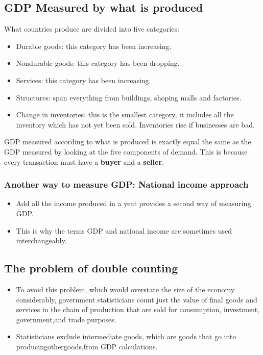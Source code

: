 \documentclass{article}
\begin{document}

\subsection{GDP Measured by what is produced}
What countries produce are divided into five categories: 
\begin{itemize}
    \item Durable goods: this category has been increasing.
    \item Nondurable goods: this category has been dropping.
    \item Services: this category has been increasing. 
    \item Structures: span everything from buildings, shoping malls and factories.
    \item Change in inventories: this is the smallest category, it includes all the inventory which has not yet been sold. Inventories rise if businesses are bad. 
\end{itemize}
GDP measured according to what is produced is exactly equal the same as the GDP measured by looking at the five components of demand. This is because every transaction must have a \textbf{buyer} and a \textbf{seller}.

\subsubsection{Another way to measure GDP: National income approach}
\begin{itemize}
    \item Add all the income produced in a yeat provides a second way of measuring GDP.
    \item This is why the terms GDP and national income are sometimes used interchangeably. 
\end{itemize}


\subsection{The problem of double counting}
\begin{itemize}
    \item To avoid this problem, which would overstate the size of the economy considerably, government statisticians count just the value of final goods and services in the chain of production that are sold for consumption, investment, government,and trade purposes.
    \item Statisticians exclude intermediate goods, which are goods that go into producingothergoods,from GDP calculations. 
\end{itemize}
\end{document}
